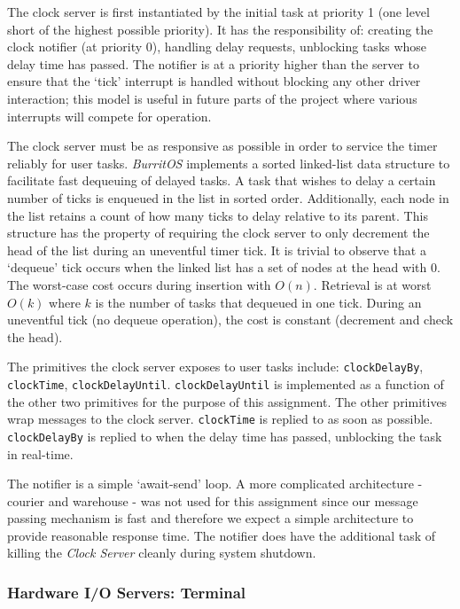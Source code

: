 \documentclass[twoside,a4paper]{refart}
\begin{document}
The clock server is first instantiated by the initial task at priority 1 (one level short of the highest possible priority). It has the responsibility of: creating the clock notifier (at priority 0), handling delay requests, unblocking tasks whose delay time has passed. The notifier is at a priority higher than the server to ensure that the ‘tick’ interrupt is handled without blocking any other driver interaction; this model is useful in future parts of the project where various interrupts will compete for operation.

The clock server must be as responsive as possible in order to service the timer reliably for user tasks. \textit{BurritOS} implements a sorted linked-list data structure to facilitate fast dequeuing of delayed tasks. A task that wishes to delay a certain number of ticks is enqueued in the list in sorted order. Additionally, each node in the list retains a count of how many ticks to delay relative to its parent. This structure has the property of requiring the clock server to only decrement the head of the list during an uneventful timer tick. It is trivial to observe that a ‘dequeue’ tick occurs when the linked list has a set of nodes at the head with 0. The worst-case cost occurs during insertion with $O(n)$. Retrieval is at worst $O(k)$ where $k$ is the number of tasks that dequeued in one tick. During an uneventful tick (no dequeue operation), the cost is constant (decrement and check the head).

The primitives the clock server exposes to user tasks include: \verb~clockDelayBy~, \verb~clockTime~, \verb~clockDelayUntil~. \verb~clockDelayUntil~ is implemented as a function of the other two primitives for the purpose of this assignment. The other primitives wrap messages to the clock server. \verb~clockTime~ is replied to as soon as possible. \verb~clockDelayBy~ is replied to when the delay time has passed, unblocking the task in real-time.

The notifier is a simple ‘await-send’ loop. A more complicated architecture - courier and warehouse - was not used for this assignment since our message passing mechanism is fast and therefore we expect a simple architecture to provide reasonable response time. The notifier does have the additional task of killing the \textit{Clock Server} cleanly during system shutdown.

\subsubsection{Hardware I/O Servers: Terminal}
\end{document}
